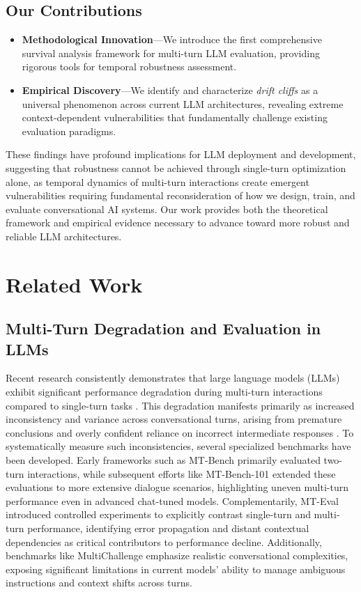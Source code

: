 \documentclass[letterpaper]{article}
\begin{document}
\subsection{Our Contributions}
\begin{itemize}
    \item \textbf{Methodological Innovation}—We introduce the first comprehensive survival analysis framework for multi-turn LLM evaluation, providing rigorous tools for temporal robustness assessment.

    \item \textbf{Empirical Discovery}—We identify and characterize \emph{drift cliffs} as a universal phenomenon across current LLM architectures, revealing extreme context-dependent vulnerabilities that fundamentally challenge existing evaluation paradigms.
\end{itemize} 
    These findings have profound implications for LLM deployment and development, suggesting that robustness cannot be achieved through single-turn optimization alone, as temporal dynamics of multi-turn interactions create emergent vulnerabilities requiring fundamental reconsideration of how we design, train, and evaluate conversational AI systems. Our work provides both the theoretical framework and empirical evidence necessary to advance toward more robust and reliable LLM architectures.

\section{Related Work}

\subsection{Multi-Turn Degradation and Evaluation in LLMs}
Recent research consistently demonstrates that large language models (LLMs) exhibit significant performance degradation during multi-turn interactions compared to single-turn tasks \cite{laban2025llms, li2025beyond}. This degradation manifests primarily as increased inconsistency and variance across conversational turns, arising from premature conclusions and overly confident reliance on incorrect intermediate responses \cite{laban2025llms}. To systematically measure such inconsistencies, several specialized benchmarks have been developed. Early frameworks such as MT-Bench \cite{zheng2023judging} primarily evaluated two-turn interactions, while subsequent efforts like MT-Bench-101 \cite{bai2024mt} extended these evaluations to more extensive dialogue scenarios, highlighting uneven multi-turn performance even in advanced chat-tuned models. Complementarily, MT-Eval \cite{kwan2024mt} introduced controlled experiments to explicitly contrast single-turn and multi-turn performance, identifying error propagation and distant contextual dependencies as critical contributors to performance decline. Additionally, benchmarks like MultiChallenge \cite{sirdeshmukh2025multichallenge} emphasize realistic conversational complexities, exposing significant limitations in current models' ability to manage ambiguous instructions and context shifts across turns.
\end{document}
